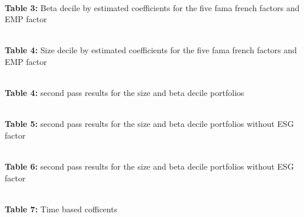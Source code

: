 \documentclass[12pt,oneside,reqno]{amsart}
\begin{document}
\begin{center}
    \paperspacingnarrow
    \\
    \textbf{Table 3:} Beta decile by estimated coefficients for the  five fama french factors and EMP factor\\
    \paperspacingwide
\end{center}


\vspace{1cm}


\begin{center}
    \paperspacingnarrow
    \\
    \textbf{Table 4:} Size decile by estimated coefficients for the  five fama french factors and EMP factor\\
    \paperspacingwide
\end{center}


\begin{center}
    \paperspacingnarrow
    \\
    \textbf{Table 4:} second pass results for the size and beta decile portfolios\\
    \paperspacingwide
\end{center}


\begin{center}
    \paperspacingnarrow
    \\
    \textbf{Table 5:} second pass results for the size and beta decile portfolios without ESG factor\\
    \paperspacingwide
\end{center}


\begin{center}
    \paperspacingnarrow
    \\
    \textbf{Table 6:} second pass results for the size and beta decile portfolios without ESG factor\\
    \paperspacingwide
\end{center}


\begin{center}
    \paperspacingnarrow
    \\
    \textbf{Table 7:} Time based cofficents
    \paperspacingwide
\end{center}

\clearpage
\restoregeometry


%
\end{document}

